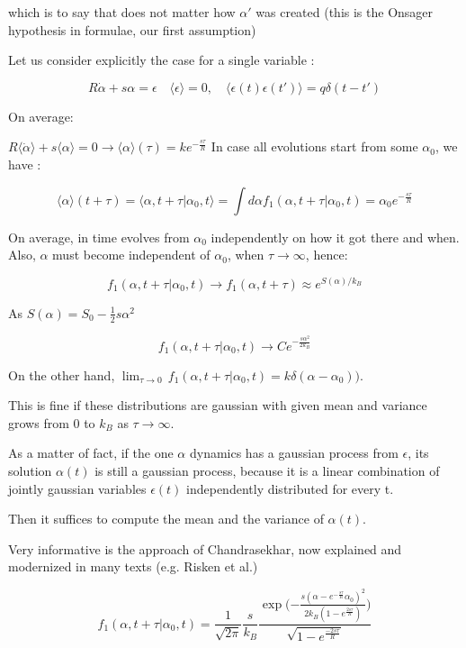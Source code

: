 \documentclass{article}
\begin{document}
which is to say that does not matter how $\alpha'$ was created (this is the Onsager hypothesis in formulae, our first assumption)

Let us consider explicitly the case for a single variable :

$$ R \dot{\alpha} + s \alpha = \epsilon \quad \langle \epsilon \rangle = 0 , \quad \langle \epsilon(t) \epsilon(t') \rangle = q \delta (t-t') $$

On average:

$R \langle\dot{\alpha} \rangle + s \langle \alpha \rangle = 0 \rightarrow \langle \alpha \rangle (\tau) = k e^{- \frac{s \tau}{R} }$
In case all evolutions start from some $\alpha_0$, we have :

$$ \langle \alpha \rangle (t + \tau) = \langle \alpha,t+\tau|\alpha_0,t \rangle = \int d \alpha f_1(\alpha,t+\tau | \alpha_0,t ) = \alpha_0 e^{-\frac{s \tau}{R}}$$

On average, in time evolves from $\alpha_0$ independently on how it got there and when. Also, $\alpha$ must become independent of $\alpha_0$, when $ \tau \to \infty$, hence:

$$ f_1(\alpha,t+\tau|\alpha_0,t) \to f_1(\alpha,t+\tau) \approx e^{S(\alpha)/k_B}$$

As $S(\alpha) = S_0 - \frac{1}{2} s \alpha^2$

$$ f_1(\alpha,t+\tau|\alpha_0,t) \to C e^{-\frac{s \alpha^2}{2 k_B} } $$
	
On the other hand, $\lim_{\tau \to 0}\, f_1(\alpha,t+\tau|\alpha_0,t) = k \delta(\alpha - \alpha_0))$.

This is fine if these distributions are gaussian with given mean and variance grows from 0 to $k_B$ as $\tau \to \infty$.

As a matter of fact, if the one $\alpha$ dynamics has a gaussian process from $\epsilon$, its solution $\alpha(t)$ is still a gaussian process, because it is a linear combination of jointly gaussian variables $\epsilon(t)$ independently distributed for every t.

Then it suffices to compute the mean and the variance of $\alpha(t)$.

Very informative is the approach of Chandrasekhar, now explained and modernized in many texts (e.g. Risken et al.)

$$f_1(\alpha,t+\tau | \alpha_0,t) = \frac{1}{\sqrt{2 \pi}} \frac{s}{k_B} \frac{ \exp \Big({- \frac{s(\alpha-e^{-\frac{s \tau }{R}}\alpha_0 )^2}{2 k_B(1-e^{\frac{2s\tau}{R}})} } \Big )}{\sqrt{1-e^{\frac{-2s\tau}{R}}}} $$
\end{document}
